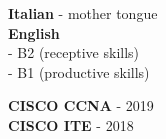 \documentclass[9pt]{developercv} %
\begin{document}

\begin{minipage}[t]{0.3\textwidth}
	\vspace{-\baselineskip} %

	
	\textbf{Italian} - mother tongue \\
	\textbf{English} \\
	- B2 (receptive skills) \\
	- B1 (productive skills)
\end{minipage}
\hfill
\begin{minipage}[t]{0.3\textwidth}
	\vspace{-\baselineskip} %
	
	
	\textbf{CISCO CCNA} - 2019 \\
	\textbf{CISCO ITE} - 2018	
\end{minipage}

\end{document}
